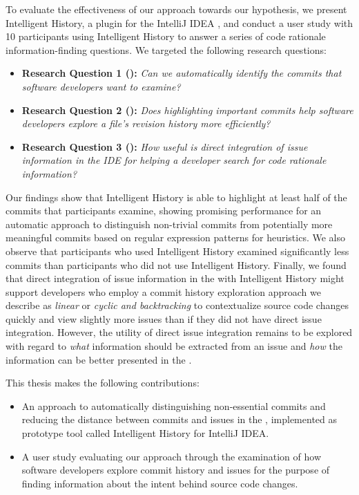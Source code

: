 To evaluate the effectiveness of our approach towards our hypothesis, we present Intelligent History, a plugin for the IntelliJ IDEA ,
and conduct a user study with 10 participants using Intelligent History to answer a series of code rationale information-finding questions.
We targeted the following research questions:

\begin{itemize}[leftmargin=*]
    \item[] \textbf{Research Question 1 ():} \textit{Can we automatically identify the commits that software developers want to examine?}
    \item[] \textbf{Research Question 2 ():} \textit{Does highlighting important commits help software developers explore a file’s revision history more efficiently?}
    \item[] \textbf{Research Question 3 ():} \textit{How useful is direct integration of issue information in the IDE for helping a developer search for code rationale information?}
\end{itemize}

Our findings show that Intelligent History is able to highlight at least half of
the commits that participants examine, showing promising performance for
an automatic approach to distinguish non-trivial commits from potentially
more meaningful commits based on regular expression patterns for heuristics.
We also observe that participants who used Intelligent History examined significantly
less commits than participants who did not use Intelligent History.
Finally, we found that direct integration of issue information in the 
with Intelligent History might support developers who employ a commit history exploration approach
we describe as \textit{linear} or \textit{cyclic and backtracking} to contextualize
source code changes quickly and view slightly more issues than if they did not have
direct issue integration. 
However, the utility of direct issue integration remains to be explored with
regard to \emph{what} information should be extracted from an issue
and \emph{how} the information can be better presented in the .

This thesis makes the following contributions:
\begin{itemize}
	\item An approach to automatically distinguishing non-essential commits and reducing the distance between commits and issues in the , 
		implemented as prototype tool called Intelligent History for IntelliJ IDEA.
	\item A user study evaluating our approach through the examination of how software developers explore commit history and issues
		for the purpose of finding information about the intent behind source code changes.
\end{itemize}

